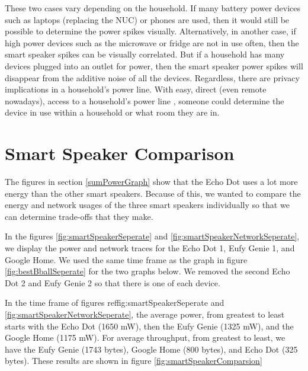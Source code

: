 These two cases vary depending on the household. If many battery power devices such as laptops (replacing the NUC) or phones are used, then it would still be possible to determine the power spikes visually. Alternatively, in another case, if high power devices such as the microwave or fridge are not in use often, then the smart speaker spikes can be visually correlated. But if a household has many devices plugged into an outlet for power, then the smart speaker power spikes will disappear from the additive noise of all the devices. Regardless, there are privacy implications in a household's power line. With easy, direct (even remote nowadays), access to a household's power line \cite{griffith_2017}, someone could determine the device in use within a household or what room they are in.

\section{Smart Speaker Comparison}
\label{smartSpeakerComparisonSection}
The figures in section \ref{sumPowerGraph} show that the Echo Dot uses a lot more energy than the other smart speakers. Because of this, we wanted to compare the energy and network usages of the three smart speakers individually so that we can determine trade-offs that they make.

In the figures \ref{fig:smartSpeakerSeperate} and \ref{fig:smartSpeakerNetworkSeperate}, we display the power and network traces for the Echo Dot 1, Eufy Genie 1, and Google Home. We used the same time frame as the graph in figure \ref{fig:bestBballSeperate} for the two graphs below. We removed the second Echo Dot 2 and Eufy Genie 2 so that there is one of each device.

In the time frame of figures ref{fig:smartSpeakerSeperate} and \ref{fig:smartSpeakerNetworkSeperate}, the average power, from greatest to least starts with the Echo Dot (1650 mW), then the Eufy Genie (1325 mW), and the Google Home (1175 mW). For average throughput, from greatest to least, we have the Eufy Genie (1743 bytes), Google Home (800 bytes), and Echo Dot (325 bytes). These results are shown in figure \ref{fig:smartSpeakerComparsion}

